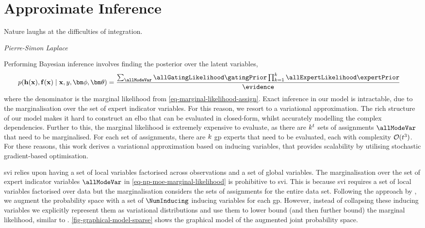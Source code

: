 \documentclass{mimosis-class/mimosis}
\numberwithin{equation}{chapter}
\newcommand{\numData}{\ensuremath{t}}
\newcommand{\modeInd}{\ensuremath{k}}
\newcommand{\NumData}{\ensuremath{\MakeUppercase{\numData}}}
\newcommand{\ModeInd}{\ensuremath{\MakeUppercase{\modeInd}}}
\newcommand{\allData}[1]{\ensuremath{\MakeUppercase{#1}}}
\newcommand{\x}{\ensuremath{\mathbf{x}}}
\newcommand{\y}{\ensuremath{y}}
\newcommand{\allInput}{\ensuremath{\allData{\x}}}
\newcommand{\allOutput}{\ensuremath{\allData{\y}}}
\newcommand{\gatingFunc}{\ensuremath{h}}
\newcommand{\GatingFunc}{\ensuremath{\mathbf{\gatingFunc}}}
\newcommand{\latentFunc}{\ensuremath{f}}
\newcommand{\LatentFunc}{\ensuremath{\mathbf{\latentFunc}}}
\newcommand{\gatingParams}{\ensuremath{\bm\phi}}
\newcommand{\expertParams}{\ensuremath{\bm\theta}}
\begin{document}
{\section{Approximate Inference \label{sec-inference}}
\label{sec:orge43ac94}
\epigraph{Nature laughs at the difficulties of integration.}{\textit{Pierre-Simon Laplace}}
Performing Bayesian inference involves finding the posterior over the latent variables,
\begin{align} \label{eq-}
p(\GatingFunc(\allInput), \LatentFunc(\allInput) \mid \allInput, \allOutput, \gatingParams, \expertParams)
&= \frac{\sum_{\allModeVar} \allGatingLikelihood \gatingPrior
\prod_{\modeInd=1}^{\ModeInd} \allExpertLikelihood \expertPrior}{\evidence}
\end{align}
where the denominator is the marginal likelihood from \cref{eq-marginal-likelihood-assign}.
Exact inference in our model is intractable, due to the marginalisation over the set of expert indicator variables.
For this reason, we resort to a variational approximation.
The rich structure of our model makes it hard to construct an \acrshort{elbo} that can
be evaluated in closed-form, whilst accurately modelling the complex dependencies.
Further to this, the marginal likelihood is extremely expensive to evaluate,
as there are \(\ModeInd^{\NumData}\) sets of assignments \(\allModeVar\) that need to be marginalised.
For each set of assignments, there are \(\ModeInd\) \acrshort{gp} experts that need to be evaluated, each with
complexity \(\mathcal{O}(\NumData^{3})\).
For these reasons, this work derives a variational approximation based on inducing variables, that provides scalability
by utilising stochastic gradient-based optimisation.

\acrfull{svi} \citep{hoffmanStochastic2013} relies upon having a set of local variables
factorised across observations and a set of global variables.
The marginalisation over the set of expert indicator variables \(\allModeVar\)
in \cref{eq-np-moe-marginal-likelihood} is prohibitive to \acrshort{svi}.
This is because \acrshort{svi} requires a set of local variables factorised over data but the
marginalisation considers the sets of assignments for the entire data set.
Following the approach by \cite{titsiasVariational2009}, we augment the probability space
with a set of \(\NumInducing\) inducing variables for each \acrshort{gp}.
However, instead of collapsing these inducing variables we explicitly
represent them as variational distributions and use them to lower bound
(and then further bound) the marginal likelihood, similar to
\cite{hensmanGaussian2013,hensmanScalable2015}.
\cref{fig-graphical-model-sparse} shows the graphical model of the augmented joint probability space.


}
\end{document}
